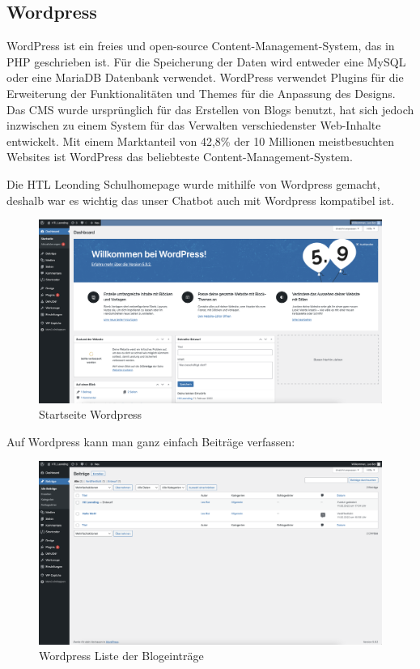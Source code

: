 \subsection{Wordpress}
WordPress ist ein freies und open-source Content-Management-System, das in PHP geschrieben ist.
Für die Speicherung der Daten wird entweder eine MySQL oder eine MariaDB Datenbank verwendet.
WordPress verwendet Plugins für die Erweiterung der Funktionalitäten und Themes für die Anpassung des Designs.
Das CMS wurde ursprünglich für das Erstellen von Blogs benutzt, hat sich jedoch inzwischen zu einem System für das Verwalten verschiedenster Web-Inhalte entwickelt.
Mit einem Marktanteil von 42,8\% der 10 Millionen meistbesuchten Websites ist WordPress das beliebteste Content-Management-System.

Die HTL Leonding Schulhomepage wurde mithilfe von Wordpress gemacht, deshalb war es wichtig das unser Chatbot auch mit Wordpress kompatibel ist.


\begin{figure}[hbt!]
    \centering
    \includegraphics[scale=0.2]{pics/wordpresshome}
    \caption{Startseite Wordpress}
    \label{fig:impl:wordpresshome}
\end{figure}


Auf Wordpress kann man ganz einfach Beiträge verfassen:

\begin{figure}[hbt!]
    \centering
    \includegraphics[scale=0.2]{pics/bloglist}
    \caption{Wordpress Liste der Blogeinträge}
    \label{fig:impl:bloglist}
\end{figure}


